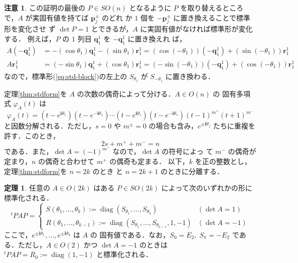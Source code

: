 \documentclass[11pt, uplatex, dvipdfmx, titlepage]{jsarticle}
\renewcommand{\i}{\mathbf{i}}
\DeclareMathOperator{\diag}{diag}
\theoremstyle{definition}
\newtheorem{theorem}{定理}[section]
\newtheorem*{remark}{注意}
\begin{document}
\begin{remark}
  この証明の最後の $P \in SO(n)$ となるように $P$ を取り替えるところ
  で，$A$ が実固有値を持てば $\bm{p}^{\pm}_{j}$ のどれ
  か $1$ 個を $-\bm{p}^{\pm}_j$ に置き換えることで標準形を変化させ
  ず $\det P=1$ とできるが，$A$ に実固有値がなければ標準形が変化する．
  例えば，$P$ の $1$ 列目 $\bm{q}^1_1$ を $-\bm{q}^1_1$ に置き換えれ
  ば，
\[
  \begin{aligned}
    A \left( -\bm{q}^1_1\right) &= -\left( \cos
      \theta_1\right)\bm{q}^1_1 -\left( \sin \theta_1\right)
    \bm{r}^{1}_1 = \left(
      \cos\left(-\theta_1\right)\right)\left(-\bm{q}^1_1\right) +
    \left( \sin \left(-\theta_1\right) \right) \bm{r}^1_1\\
    A\bm{r}^1_1&= \left( -\sin \theta_1\right) \bm{q}^1_1 + \left(
      \cos \theta_1\right) \bm{r}^1_1 =
    \left(-\sin\left(-\theta_1\right)\right) \left( -\bm{q}^1_1\right)
    + \left( \cos\left(-\theta_1\right)\right) \bm{r}^1_1
  \end{aligned}
\]
なので，標準形(\ref{eq:std-block})の左上の $S_{\theta_1}$ が $S_{-\theta_1}$ に置き換わる．
\end{remark}

定理\ref{thm:stdform}を $A$ の次数の偶奇によって分ける．$A\in O(n)$ の
固有多項式 $\varphi_A(t)$ は
\begin{equation}\label{eq:eigen-poly}
  \varphi_A(t)=(t-e^{\i \theta_1})(t-e^{-\i \theta_1}) \cdots
  (t-e^{\i\theta_s})(t-e^{-\i \theta_s})(t-1)^{m^+}(t+1)^{m^-}
\end{equation}
と因数分解される．ただし，$s=0$ や $m^{\pm}=0$ の場合も含み，$e^{\pm
  \i\theta_j}$ たちに重複を許す．このとき，
\begin{equation}\label{eq:deg-eigen}
  2s+ m^{+} + m^{-} = n
\end{equation}
である．また，$\det A=(-1)^{m^-}$ なので，$\det A$ の符号によっ
て $m^{-}$ の偶奇が定まり，$n$ の偶奇と合わせて $m^{+}$ の偶奇も定まる．
以下，$k$ を正の整数とし，定理\ref{thm:stdform}を $n=2k$ のとき
と $n=2k+1$ のときに分離する．

\begin{theorem}\label{thm:stdeven}
  任意の $A \in O(2k)$ はある $P \in SO(2k)$ によって次のいずれかの形に
  標準化される．
  \[
    {}^{t}P A P =\left\{
      \begin{array}{ll}
        S(\theta_1, \ldots, \theta_k):= \diag\left( S_{\theta_1}, \ldots, S_{\theta_k}\right)
        & (\det A=1) \\
        R(\theta_1, \ldots, \theta_{k-1}):= \diag\left( S_{\theta_1}, \ldots, S_{\theta_{k-1}}, 1, -1\right)
        & (\det A =-1)
      \end{array}
    \right.
  \]
  ここで，$e^{\pm \i \theta_1}, \ldots, e^{\pm \i \theta_k}$ は $A$ の
  固有値である．なお，$S_0=E_2, \; S_{\pi}=-E_2$ である．ただし，$A
  \in O(2)$ かつ $\det A=-1$ のときは ${}^{t}PAP= R_0:=\diag(1,-1)$ と標準化される．
\end{theorem}
\end{document}
